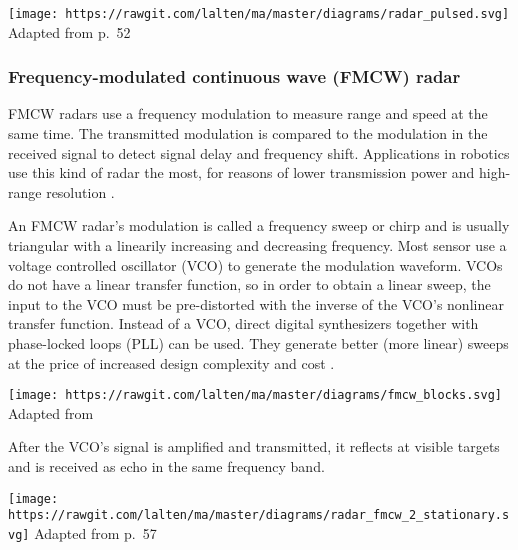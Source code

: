 \texttt{[image: https://rawgit.com/lalten/ma/master/diagrams/radar\_pulsed.svg]}
Adapted from \cite{Adams2012} p.~52

\subsubsection{Frequency-modulated continuous wave (FMCW)
radar}\label{frequency-modulated-continuous-wave-fmcw-radar}

FMCW radars use a frequency modulation to measure range and speed at the
same time. The transmitted modulation is compared to the modulation in
the received signal to detect signal delay and frequency shift.
Applications in robotics use this kind of radar the most, for reasons of
lower transmission power and high-range resolution \cite{Adams2012}.

An FMCW radar's modulation is called a frequency sweep or chirp and is
usually triangular with a linearily increasing and decreasing frequency.
Most sensor use a voltage controlled oscillator (VCO) to generate the
modulation waveform. VCOs do not have a linear transfer function, so in
order to obtain a linear sweep, the input to the VCO must be
pre-distorted with the inverse of the VCO's nonlinear transfer function.
Instead of a VCO, direct digital synthesizers together with phase-locked
loops (PLL) can be used. They generate better (more linear) sweeps at
the price of increased design complexity and cost \cite{Ernst2016}.

\texttt{[image: https://rawgit.com/lalten/ma/master/diagrams/fmcw\_blocks.svg]}
Adapted from \cite{VanZeijl2014}

After the VCO's signal is amplified and transmitted, it reflects at
visible targets and is received as echo in the same frequency band.

\texttt{[image: https://rawgit.com/lalten/ma/master/diagrams/radar\_fmcw\_2\_stationary.svg]}
Adapted from \cite{Adams2012} p.~57

